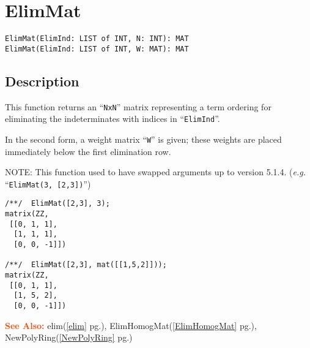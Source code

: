 \documentclass[a4paper]{mybook}
\newenvironment{command}{}{} %
\newcommand\SeeAlso{\par\textcolor{OrangeRed}{\textbf{\large See Also: }}}
\begin{document}
\section{ElimMat}
\label{ElimMat}
\begin{command} %


\begin{Verbatim}[label=syntax, rulecolor=\color{MidnightBlue},
frame=single]
ElimMat(ElimInd: LIST of INT, N: INT): MAT
ElimMat(ElimInd: LIST of INT, W: MAT): MAT
\end{Verbatim}


\subsection*{Description}

This function returns an ``\verb&NxN&'' matrix representing a term ordering
for eliminating the indeterminates with indices in ``\verb&ElimInd&''.
\par 
In the second form, a weight matrix ``\verb&W&'' is given; these weights are
placed immediately below the first elimination row.
\par 
NOTE: This function used to have swapped arguments up to version
5.1.4. (\textit{e.g.} ``\verb&ElimMat(3, [2,3])&'')
\begin{Verbatim}[label=example, rulecolor=\color{PineGreen}, frame=single]
/**/  ElimMat([2,3], 3);
matrix(ZZ,
 [[0, 1, 1],
  [1, 1, 1],
  [0, 0, -1]])

/**/  ElimMat([2,3], mat([[1,5,2]]));
matrix(ZZ,
 [[0, 1, 1],
  [1, 5, 2],
  [0, 0, -1]])
\end{Verbatim}


\SeeAlso %
  elim(\ref{elim} pg.\pageref{elim}), 
    ElimHomogMat(\ref{ElimHomogMat} pg.\pageref{ElimHomogMat}), 
    NewPolyRing(\ref{NewPolyRing} pg.\pageref{NewPolyRing})
\end{command} %
\end{document}
